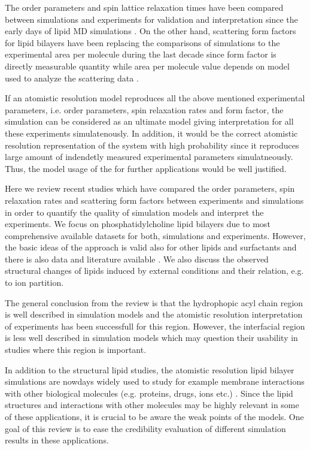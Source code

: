 \documentclass[aps,prl,superscriptaddress,twocolumn]{revtex4}
\begin{document}
The order parameters and spin lattice relaxation times have been compared between simulations
and experiments for validation and interpretation since the early days of lipid MD simulations \cite{??}.
On the other hand, scattering form factors for lipid bilayers have been replacing the 
comparisons of simulations to the experimental area per molecule during the last decade
since form factor is directly measurable quantity while area per molecule value depends on
model used to analyze the scattering data \cite{nagle00}.

If an atomistic resolution model reproduces all the above mentioned experimental parameters,
i.e. order parameters, spin relaxation rates and form factor, the simulation can be considered
as an ultimate model giving interpretation for all these experiments simulatenously.
In addition, it would be the correct atomistic resolution representation of the system with high
probability since it reproduces large amount of indendetly measured experimental parameters 
simulatneously. Thus, the model usage of the for further applications would be well justified.

Here we review recent studies which have compared the order parameters, spin relaxation rates
and scattering form factors between experiments and simulations in order to quantify the quality
of simulation models and interpret the experiments.  We focus on phosphatidylcholine lipid
bilayers due to most comprehensive available datasets for both, simulations and experiments.
However, the basic ideas of the approach is valid also for other lipids and surfactants and there
is also data and literature available \cite{??}. We also discuss the observed structural changes of
lipids induced by external conditions and their relation, e.g. to ion partition. 
 
The general conclusion from the review is that the hydrophopic acyl chain region is well described
in simulation models and the atomistic resolution interpretation of experiments has been successfull 
for this region. However, the interfacial region is less well described in simulation models which
may question their usability in studies where this region is important.

In addition to the structural lipid studies, the atomistic resolution lipid bilayer simulations are nowdays
widely used to study for example membrane interactions with other biological molecules 
(e.g. proteins, drugs, ions etc.) \cite{??}. Since the lipid structures and 
interactions with other molecules may be highly relevant in some of these applications,
it is crucial to be aware the weak points of the models. One goal of this review
is to ease the credibility evaluation of different simulation results in these applications. 
\end{document}
